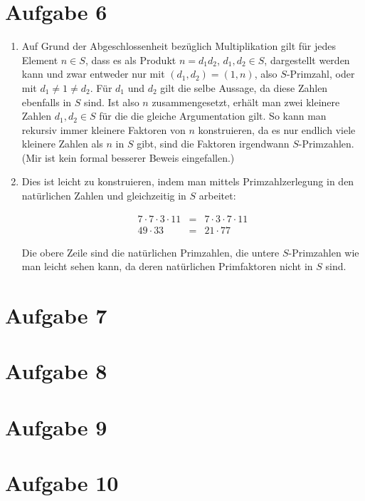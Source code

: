 \section*{Aufgabe 6}
\begin{enumerate}[(1)]
\item Auf Grund der Abgeschlossenheit bezüglich Multiplikation gilt für jedes Element $n \in S$, dass es als Produkt $n = d_1 d_2$, $d_1, d_2 \in S$, 
dargestellt werden kann und zwar entweder nur mit $(d_1, d_2) = (1, n)$, also $S$-Primzahl, oder mit $d_1 \neq 1 \neq d_2$. Für $d_1$ und $d_2$ gilt die selbe Aussage,
da diese Zahlen ebenfalls in $S$ sind. Ist also $n$ zusammengesetzt, erhält man zwei kleinere Zahlen $d_1, d_2 \in S$ für die die gleiche Argumentation gilt. So kann man
rekursiv immer kleinere Faktoren von $n$ konstruieren, da es nur endlich viele kleinere Zahlen als $n$ in $S$ gibt, sind die Faktoren irgendwann $S$-Primzahlen.
(Mir ist kein formal besserer Beweis eingefallen.)

\item Dies ist leicht zu konstruieren, indem man mittels Primzahlzerlegung in den natürlichen Zahlen und gleichzeitig in $S$ arbeitet:

\begin{eqnarray}  7 \cdot 7 \cdot 3 \cdot 11 & =& 7 \cdot 3 \cdot 7 \cdot 11 \\ 49 \cdot 33 &=& 21 \cdot 77  \end{eqnarray}

Die obere Zeile sind die natürlichen Primzahlen, die untere $S$-Primzahlen wie man leicht sehen kann, da deren natürlichen Primfaktoren nicht in $S$ sind.

\end{enumerate}


\section*{Aufgabe 7}

\section*{Aufgabe 8}

\section*{Aufgabe 9}

\section*{Aufgabe 10}
